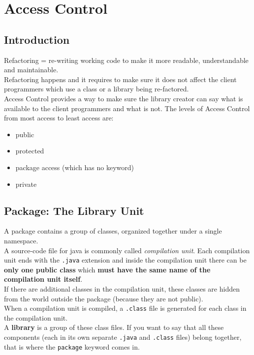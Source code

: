 \documentclass[10pt,letterpaper]{report}
\begin{document}
\tableofcontents
\chapter{Access Control}
\section{Introduction}
Refactoring = re-writing working code to make it more readable, understandable and maintainable.\\
Refactoring happens and it requires to make sure it does not affect the client programmers which use a class or a library being re-factored.\\
Access Control provides a way to make sure the library creator can say what is available to the client programmers and what is not. The levels of Access Control from most access to least access are:
\begin{itemize}
\item public
\item protected
\item package access (which has no keyword)
\item private
\end{itemize}
\section{Package: The Library Unit}
A package contains a group of classes, organized together under a single namespace.\\

A source-code file for java is commonly called \textit{compilation unit}. Each compilation unit ends with the \texttt{.java} extension and inside the compilation unit there can be \textbf{only one public class} which \textbf{must have the same name of the compilation unit itself}.\\

If there are additional classes in the compilation unit, these classes are hidden from the world outside the package (because they are not public).\\

When a compilation unit is compiled, a \texttt{.class} file is generated for each class in the compilation unit.\\

A \textbf{library} is a group of these class files. If you want to say that all these components (each in its own separate \texttt{.java} and \texttt{.class} files) belong together, that is where the \texttt{package} keyword comes in.\\
\end{document}
